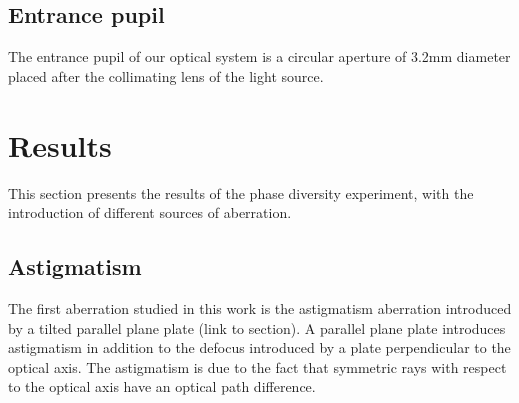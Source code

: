 \subsection{Entrance pupil}

The entrance pupil of our optical system is a circular aperture of 3.2mm diameter placed after the collimating lens of the light source. 


\section{Results}

This section presents the results of the phase diversity experiment, with the introduction of different sources of aberration.

\subsection{Astigmatism}

The first aberration studied in this work is the astigmatism aberration introduced by a tilted parallel plane plate (link to section). A parallel plane plate introduces astigmatism in addition to the defocus introduced by a plate perpendicular to the optical axis. The astigmatism is due to the fact that symmetric rays with respect to the optical axis have an optical path difference. 
